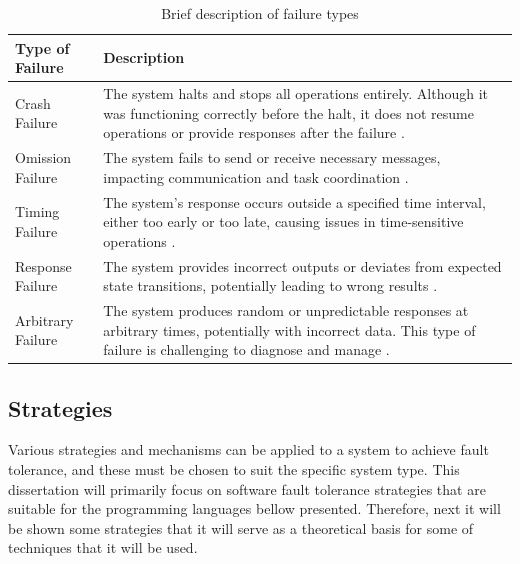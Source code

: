 \begin{table}[h!]
    \centering
    \begin{tabular}{|l|p{11.3cm}|}
        \hline
        \textbf{Type of Failure} & \textbf{Description}                                                                                                                                                                                  \\ \hline
        Crash Failure            & The system halts and stops all operations entirely. Although it was functioning correctly before the halt, it does not resume operations or provide responses after the failure \cite{Tanenbaum2023}. \\ \hline
        Omission Failure         & The system fails to send or receive necessary messages, impacting communication and task coordination \cite{Isukapalli2024}.                                                                          \\ \hline
        Timing Failure           & The system’s response occurs outside a specified time interval, either too early or too late, causing issues in time-sensitive operations \cite{Isukapalli2024}.                                      \\ \hline
        Response Failure         & The system provides incorrect outputs or deviates from expected state transitions, potentially leading to wrong results \cite{Tanenbaum2023}.                                                         \\ \hline
        Arbitrary Failure        & The system produces random or unpredictable responses at arbitrary times, potentially with incorrect data. This type of failure is challenging to diagnose and manage \cite{Tanenbaum2023}.           \\ \hline
    \end{tabular}
    \caption{Brief description of failure types}
    \label{tab:failure_types}
\end{table}

\subsection{Strategies}

Various strategies and mechanisms can be applied to a system to achieve fault tolerance, and these must be chosen to suit the specific system type. This dissertation will primarily focus on software fault tolerance strategies that are suitable for the programming languages bellow presented. Therefore, next it will be shown some strategies that it will serve as a theoretical basis for some of techniques that it will be used.

